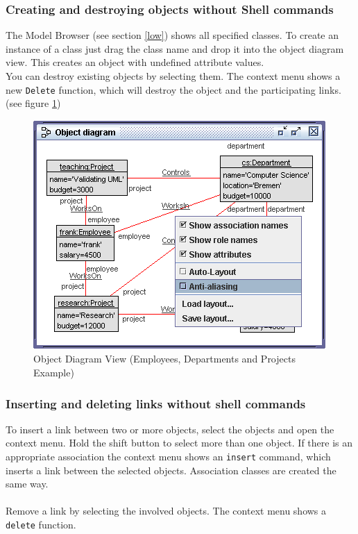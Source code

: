 \documentclass[a4paper,titlepage,oneside,final]{scrreprt} %
\begin{document}
\subsubsection{Creating and destroying objects without Shell commands}
The Model Browser (see section \ref{low}) shows all specified classes.
To create an instance of a class just drag the class name and drop
it into the object diagram view. This creates an object with undefined
attribute values.\\
You can destroy existing objects by selecting them. The context menu
shows a new \verb+Delete+ function, which will destroy the object and
the participating links. (see figure \ref{fig:ObjectDiagramViewAllFunctions})
\begin{figure}[ht]
\centering
\includegraphics[scale=0.7]{Screenshots/GUI/Views/ObjectDiagramView.png}
\caption{Object Diagram View (Employees, Departments and Projects Example)}
\label{fig:ObjectDiagramViewAllFunctions}
\end{figure}
\subsubsection{Inserting and deleting links without shell commands}
To insert a link between two or more objects, select the objects
and open the context menu. Hold the shift button to select more than
one object. If there is an appropriate association the context menu shows
an \verb+insert+ command, which inserts
a link between the selected objects.
Association classes are created the same way.\\\\
Remove a link by selecting the involved objects. The context menu
shows a \verb+delete+ function.
\end{document}
